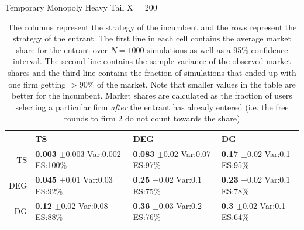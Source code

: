 \documentclass[letterpaper]{article}
\theoremstyle{definition}
\begin{document}
\begin{table}[ht]
\centering
\caption{Temporary Monopoly Heavy Tail X = 200}
\begin{tabular}{rlll}
  \hline
 & TS & DEG &  DG \\
  \hline
TS & \makecell{\textbf{0.003} $\pm$0.003\\Var:0.002\\ES:100\%} & \makecell{\textbf{0.083} $\pm$0.02\\Var:0.07\\ES:97\%} & \makecell{\textbf{0.17} $\pm$0.02\\Var:0.1\\ES:95\%} \\
  DEG & \makecell{\textbf{0.045} $\pm$0.01\\Var:0.03\\ES:92\%} & \makecell{\textbf{0.25} $\pm$0.02\\Var:0.1\\ES:75\%} & \makecell{\textbf{0.23} $\pm$0.02\\Var:0.1\\ES:78\%} \\
   DG & \makecell{\textbf{0.12} $\pm$0.02\\Var:0.08\\ES:88\%} & \makecell{\textbf{0.36} $\pm$0.03\\Var:0.2\\ES:76\%} & \makecell{\textbf{0.3} $\pm$0.02\\Var:0.1\\ES:64\%} \\
   \hline
\end{tabular}
\label{ht_incum}
\caption*{\tiny{The columns represent the strategy of the incumbent and the rows represent the strategy of the entrant. The first line in each cell contains the average market share for the entrant over $N=1000$ simulations as well as a 95\% confidence interval. The second line contains the sample variance of the observed market shares and the third line contains the fraction of simulations that ended up with one firm getting $> 90\%$ of the market. Note that smaller values in the table are better for the incumbent. Market shares are calculated as the fraction of users selecting a particular firm \textit{after} the entrant has already entered (i.e. the free rounds to firm 2 do not count towards the share)}}
\end{table}
\end{document}
